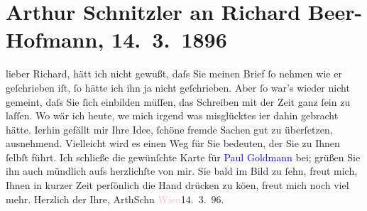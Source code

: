

               \section[Arthur Schnitzler an Richard Beer-Hofmann, 14. 3. 1896]{ Arthur Schnitzler an Richard Beer-Hofmann, 14. 3. 1896}\nopagebreak{}\rehead{ }\normalsize\beginnumbering{} \toendnotes[C]{\smallbreak\pagebreak[2]} 
\pstart
           \noindent{}{\pb}lieber Richard, hätt ich nicht gewußt, daſs Sie meinen Brief ſo
               nehmen wie er geſchrieben iſt, ſo hätte ich ihn ja nicht geſchrieben. Aber ſo war’s
               wieder nicht gemeint, daſs Sie ſich einbilden \introOben{}müſſen\introOben{}, das
               Schreiben mit der Zeit ganz ſein zu laſſen. Wo wär ich heute, we{\geminationn} mich irgend was misglücktes i{\geminationm}er dahin gebracht hätte. I{\geminationm}erhin gefällt mir Ihre Idee, ſchöne fremde Sachen gut zu überſetzen, ausnehmend.
               Vielleicht wird es einen Weg für Sie bedeuten, der Sie zu Ihnen ſelbſt führt.\pend
           \pstart
           {\pb}Ich schließe die gewünſchte Karte für \textcolor{blue}{Paul Goldmann}{}\ledrightnote{\textcolor{blue}{Paul Goldmann}} bei; grüßen Sie ihn auch mündlich
               aufs herzlichſte von mir. Sie bald im Bild zu ſehn, freut mich, Ihnen in kurzer Zeit
               perſönlich die Hand drücken zu kö{\geminationn}en, freut mich noch
               viel mehr.\pend
           \pstart Herzlich der Ihre, \spacefill\mbox{ArthSchn}\pend{}\pstart
           \textcolor{pink}{Wien}{}\ledrightnote{\textcolor{pink}{Wien}}{ }14. 3. 96.\pend
           \endnumbering{}  
      